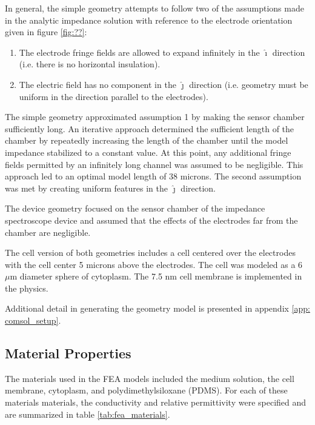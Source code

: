 \par In general, the simple geometry attempts to follow two of the assumptions made in the analytic impedance solution with reference to the electrode orientation given in figure \ref{fig:??}:
\begin{enumerate}
    \item The electrode fringe fields are allowed to expand infinitely in the $\hat{\boldsymbol\imath}$ direction (i.e. there is no horizontal insulation).
    \item The electric field has no component in the $\hat{\boldsymbol\jmath}$ direction (i.e. geometry must be uniform in the direction parallel to the electrodes).
\end{enumerate}

\par The simple geometry approximated assumption 1 by making the sensor chamber sufficiently long. An iterative approach determined the sufficient length of the chamber by repeatedly increasing the length of the chamber until the model impedance stabilized to a constant value. At this point, any additional fringe fields permitted by an infinitely long channel was assumed to be negligible. This approach led to an optimal model length of 38 microns. The second assumption was met by creating uniform features in the $\hat{\boldsymbol\jmath}$ direction.

\par The device geometry focused on the sensor chamber of the impedance spectroscope device and assumed that the effects of the electrodes far from the chamber are negligible. 


\par The cell version of both geometries includes a cell centered over the electrodes with the cell center 5 microns above the electrodes. The cell was modeled as a 6 $\mu$m diameter sphere of cytoplasm. The 7.5 nm cell membrane is implemented in the physics. 

\par Additional detail in generating the geometry model is presented in appendix \ref{app: comsol_setup}.

\subsection*{Material Properties}
\par The materials used in the FEA models included the medium solution, the cell membrane, cytoplasm, and polydimethylsiloxane (PDMS). For each of these materials materials, the conductivity and relative permittivity were specified and are summarized in table \ref{tab:fea_materials}.


